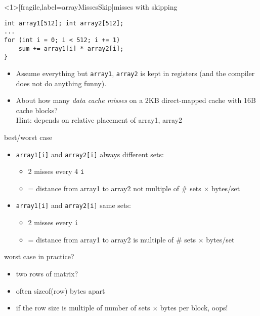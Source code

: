 \begin{frame}<1>[fragile,label=arrayMissesSkip]{misses with skipping}
\begin{lstlisting}
int array1[512]; int array2[512];
...
for (int i = 0; i < 512; i += 1)
    sum += array1[i] * array2[i];
}
\end{lstlisting}
    \begin{itemize}
        \item {\small
    Assume everything but {\tt array1}, {\tt array2} is kept in registers (and the compiler does not do
    anything funny).
        }
    \item
About how many \textit{data cache misses} on a 2KB direct-mapped cache with 16B cache blocks? \\
Hint: depends on relative placement of array1, array2
\end{itemize}
\end{frame}

\begin{frame}{best/worst case}
\begin{itemize}
\item \texttt{array1[i]} and \texttt{array2[i]} always different sets:
    \begin{itemize}
    \item 2 misses every 4 \texttt{i}
    \item = distance from array1 to array2 not multiple of \# sets $\times$ bytes/set
    \end{itemize}
\item \texttt{array1[i]} and \texttt{array2[i]} same sets:
    \begin{itemize}
    \item 2 misses every \texttt{i}
    \item = distance from array1 to array2 is multiple of \# sets $\times$ bytes/set
    \end{itemize}
\end{itemize}
\end{frame}

\begin{frame}{worst case in practice?}
    \begin{itemize}
    \item two rows of matrix?
    \item often sizeof(row) bytes apart
    \item if the row size is multiple of number of sets $\times$ bytes per block, oops!
    \end{itemize}
\end{frame}
